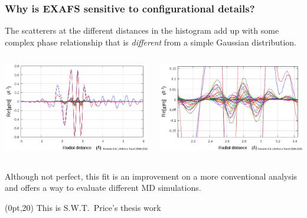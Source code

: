 \documentclass[10pt, xcolor=x11names, compress, handout]{beamer}
\begin{document}
\begin{frame}
  \frametitle{Why is EXAFS sensitive to configurational details?}

  The scatterers at the different distances in the histogram add up
  with some complex phase relationship that is \textit{different} from
  a simple Gaussian distribution.
  \begin{columns}
    \begin{column}{0.5\linewidth}
      \includegraphics[width=\linewidth]{JM/histo_fit_wpaths.png}
    \end{column}
    \begin{column}{0.5\linewidth}
      \includegraphics[width=\linewidth]{JM/histo_fit_wpaths_zoom.png}
    \end{column}
  \end{columns}
  Although not perfect, this fit is an improvement on a more
  conventional analysis and offers a way to evaluate different MD
  simulations.
  \begin{textblock*}{0.6\linewidth}(0pt,20\TPVertModule)
    \tiny This is S.W.T.\ Price's thesis work
  \end{textblock*}
\end{frame}
\end{document}

